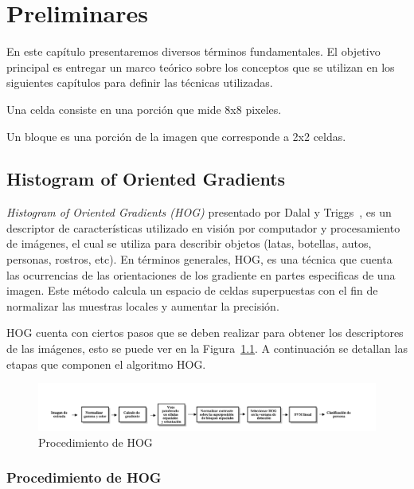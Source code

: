 \chapter[Preliminares ]{Preliminares }\label{ch:capitulo3}
En este capítulo presentaremos diversos términos fundamentales. El objetivo principal es entregar un marco teórico sobre los conceptos que se utilizan en los siguientes capítulos para definir las técnicas utilizadas.
\begin{definition}[Celdas]
\label{def:cel}
Una celda consiste en una porción que mide 8x8 pixeles.
\end{definition}
\begin{definition}[Bloques]
\label{def:blo}
Un bloque es una porción de la imagen que corresponde a 2x2 celdas.
\end{definition}

\section{Histogram of Oriented Gradients}
\label{subsec:hog}
\textit{Histogram of Oriented Gradients (HOG)} presentado por Dalal y Triggs~\cite{hog2005}, es un descriptor de características utilizado en visión por computador y procesamiento de imágenes, el cual se utiliza para describir objetos (latas, botellas, autos, personas, rostros, etc). En términos generales, HOG, es una técnica que cuenta las ocurrencias de las orientaciones de los gradiente en partes especificas de una imagen. Este método calcula un espacio de celdas superpuestas con el fin de normalizar las muestras locales y aumentar la precisión.

HOG cuenta con ciertos pasos que se deben realizar para obtener los descriptores de las imágenes, esto se puede ver en la Figura~\ref{fig:hog_procedure}. A continuación se detallan las etapas que componen el algoritmo HOG.
\begin{figure}[tb]
  \centering
   \includegraphics[width=1\textwidth]{Figuras/hog-procedure.png}
   \caption{Procedimiento de HOG}
   \label{fig:hog_procedure}
\end{figure}

\subsection{Procedimiento de HOG}

